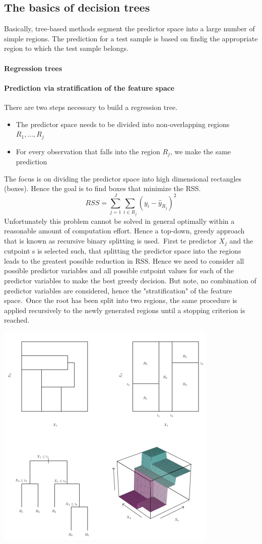\documentclass[../document.tex]{subfiles}
\begin{document}
	\subsection{The basics of decision trees}
	Basically, tree-based methods segment the predictor space into a large number of simple regions. The prediction for a test sample is based on findig the appropriate region to which the test sample belongs.
	\paragraph{Regression trees}

	\paragraph{Prediction via stratification of the feature space}
	There are two steps necessary to build a regression tree.
	\begin{itemize}
		\item The predictor space needs to be divided into non-overlapping regions \(R_{1},...,R_{j}\)
		\item For every observation that falls into the region \(R_{j}\), we make the same prediction
	\end{itemize}
	The focus is on dividing the predictor space into high dimensional rectangles (boxes). Hence the goal is to find boxes that minimize the RSS.
	\begin{equation}
		RSS = \sum_{j=1}^{J}\sum_{i\in R_{j}}(y_{i}-\hat{y}_{R_{j}})^2
	\end{equation}
	Unfortunately this problem cannot be solved in general optimally within a reasonable amount of computation effort. Hence a top-down, greedy approach that is known as recursive binary splitting is used.\
	First te predictor \(X_{j}\) and the cutpoint s is selected such, that splitting the predictor space into the regions leads to the greatest possible reduction in RSS. Hence we need to consider all possible predictor variables and all possible cutpoint values for each of the predictor variables to make the best greedy decision. But note, no combination of predictor variables are considered, hence the "stratification" of the feature space.\
	Once the root has been split into two regions, the same procedure is applied recursively to the newly generated regions until a stopping criterion is reached.
	\begin{center}
		\includegraphics[width=.6\textwidth]{pictures/tree.png}
	\end{center}
\end{document}

